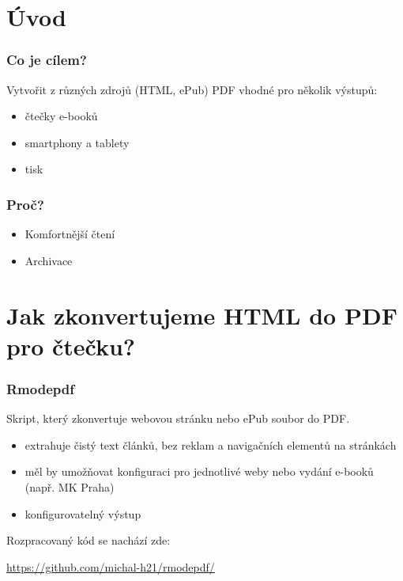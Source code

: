
\section{Úvod}

\begin{frame}
  \frametitle{Co je cílem?}
    Vytvořit z různých zdrojů (HTML, ePub) PDF vhodné pro několik výstupů:
    \begin{itemize}
      \item čtečky e-booků
      \item smartphony a tablety
      \item tisk
    \end{itemize}

  \end{frame}
  \begin{frame}
    \frametitle{Proč?}

    \begin{itemize}
      \item Komfortnější čtení
      \item Archivace
    \end{itemize}


\end{frame}

\section{Jak zkonvertujeme HTML do PDF pro čtečku?}

\begin{frame}
  \frametitle{Rmodepdf}

  Skript, který zkonvertuje webovou stránku nebo ePub soubor do PDF.

  \begin{itemize}
    \item extrahuje čistý text článků, bez reklam a navigačních elementů na stránkách
    \item měl by umožňovat konfiguraci pro jednotlivé weby nebo vydání e-booků (např. MK Praha)
    \item konfigurovatelný výstup
  \end{itemize}


    
  Rozpracovaný kód se nachází zde:

    \url{https://github.com/michal-h21/rmodepdf/}
  \end{frame}


